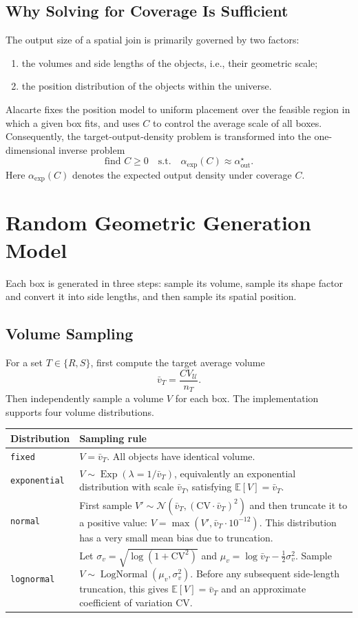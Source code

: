 \documentclass[11pt,a4paper]{article}
\newcommand{\Uset}{\mathcal{U}}
\newcommand{\Exp}{\mathbb{E}}
\newcommand{\Normal}{\mathcal{N}}
\newcommand{\LogNormal}{\operatorname{LogNormal}}
\newcommand{\ExpDist}{\operatorname{Exp}}
\newcommand{\code}[1]{\texttt{#1}}
\begin{document}
\subsection{Why Solving for Coverage Is Sufficient}

The output size of a spatial join is primarily governed by two factors:
\begin{enumerate}
  \item the volumes and side lengths of the objects, i.e., their geometric scale;
  \item the position distribution of the objects within the universe.
\end{enumerate}
Alacarte fixes the position model to uniform placement over the feasible region in which a given box fits, and uses $C$ to control the average scale of all boxes. Consequently, the target-output-density problem is transformed into the one-dimensional inverse problem
\[
  \text{find } C\ge 0
  \quad\text{s.t.}\quad
  \alpha_{\mathrm{exp}}(C)\approx \alpha_{\mathrm{out}}^\star.
\]
Here $\alpha_{\mathrm{exp}}(C)$ denotes the expected output density under coverage $C$.

\section{Random Geometric Generation Model}

Each box is generated in three steps: sample its volume, sample its shape factor and convert it into side lengths, and then sample its spatial position.

\subsection{Volume Sampling}

For a set $T\in\{R,S\}$, first compute the target average volume
\[
  \bar v_T=\frac{C V_{\Uset}}{n_T}.
\]
Then independently sample a volume $V$ for each box. The implementation supports four volume distributions.

\begin{longtable}{>{\raggedright\arraybackslash}p{3cm}p{10.5cm}}
\toprule
\textbf{Distribution} & \textbf{Sampling rule} \\
\midrule
\endhead
\code{fixed} &
$V=\bar v_T$. All objects have identical volume. \\
\code{exponential} &
$V\sim \ExpDist(\lambda=1/\bar v_T)$, equivalently an exponential distribution with scale $\bar v_T$, satisfying $\Exp[V]=\bar v_T$. \\
\code{normal} &
First sample $V'\sim\Normal(\bar v_T,(\mathrm{CV}\cdot\bar v_T)^2)$ and then truncate it to a positive value: $V=\max(V',\bar v_T\cdot10^{-12})$. This distribution has a very small mean bias due to truncation. \\
\code{lognormal} &
Let
$\sigma_v=\sqrt{\log(1+\mathrm{CV}^2)}$ and
$\mu_v=\log\bar v_T-\tfrac12\sigma_v^2$.
Sample $V\sim\LogNormal(\mu_v,\sigma_v^2)$. Before any subsequent side-length truncation, this gives $\Exp[V]=\bar v_T$ and an approximate coefficient of variation $\mathrm{CV}$. \\
\bottomrule
\end{longtable}
\end{document}
